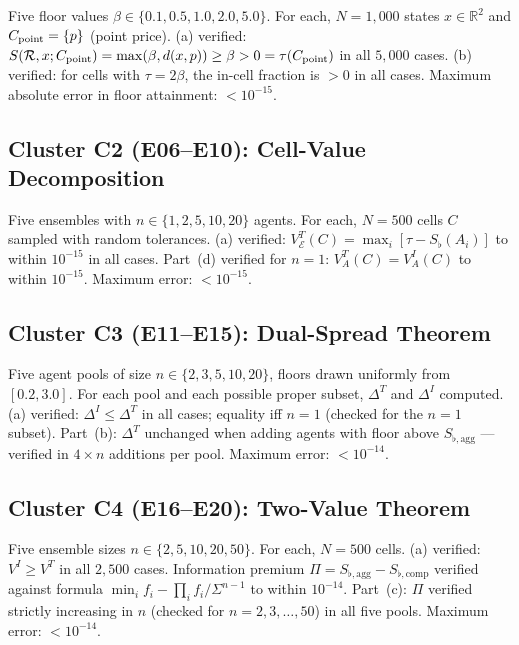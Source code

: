 \documentclass[twocolumn,11pt,a4paper]{article}
\theoremstyle{remark}
\newcommand{\R}{\mathbb{R}}
\newcommand{\Sflat}{S_{\flat}}
\newcommand{\Rec}{\mathcal{R}}
\newcommand{\tol}{\tau}
\newcommand{\Ens}{\mathcal{E}}
\newcommand{\SpreadT}{\Delta^T}          %
\newcommand{\SpreadI}{\Delta^I}          %
\newcommand{\ValT}{V^T}                  %
\newcommand{\ValI}{V^I}                  %
\newcommand{\SflatT}{S_{\flat,\mathrm{agg}}}        %
\newcommand{\SflatI}{S_{\flat,\mathrm{comp}}}       %
\newcommand{\Prem}{\Pi}                  %
\begin{document}
Five floor values $\beta \in \{0.1, 0.5, 1.0, 2.0, 5.0\}$.  For each,
$N=1{,}000$ states $x\in\R^2$ and $C_{\rm point} = \{p\}$ (point price).
(a) verified: $S(\Rec,x;C_{\rm point}) = \max(\beta,
d(x,p)) \ge \beta > 0 = \tol(C_{\rm point})$ in all $5{,}000$ cases.
(b) verified: for cells with $\tol = 2\beta$, the
in-cell fraction is $> 0$ in all cases.  Maximum absolute error in floor
attainment: $< 10^{-15}$.

\subsection*{Cluster C2 (E06--E10): Cell-Value Decomposition}

Five ensembles with $n \in \{1, 2, 5, 10, 20\}$ agents.  For each, $N=500$
cells $C$ sampled with random tolerances.  (a)
verified: $\ValT_\Ens(C) = \max_i[\tol - \Sflat(A_i)]$ to within $10^{-15}$
in all cases.  Part~(d) verified for $n=1$: $\ValT_A(C) = \ValI_A(C)$ to
within $10^{-15}$.  Maximum error: $< 10^{-15}$.

\subsection*{Cluster C3 (E11--E15): Dual-Spread Theorem}

Five agent pools of size $n \in \{2, 3, 5, 10, 20\}$, floors drawn
uniformly from $[0.2, 3.0]$.  For each pool and each possible proper subset,
$\SpreadT$ and $\SpreadI$ computed.  (a) verified:
$\SpreadI \le \SpreadT$ in all cases; equality iff $n=1$ (checked for the
$n=1$ subset).  Part~(b): $\SpreadT$ unchanged when adding agents with
floor above $\SflatT$ — verified in $4\times n$ additions per pool.
Maximum error: $< 10^{-14}$.

\subsection*{Cluster C4 (E16--E20): Two-Value Theorem}

Five ensemble sizes $n \in \{2, 5, 10, 20, 50\}$.  For each, $N=500$ cells.
(a) verified: $\ValI \ge \ValT$ in all $2{,}500$ cases.
Information premium $\Prem = \SflatT - \SflatI$ verified against formula
$\min_i f_i - \prod_i f_i/\Sigma^{n-1}$ to within $10^{-14}$.
Part~(c): $\Prem$ verified strictly increasing in $n$ (checked for $n=2,
3, \ldots, 50$) in all five pools.  Maximum error: $< 10^{-14}$.
\end{document}

